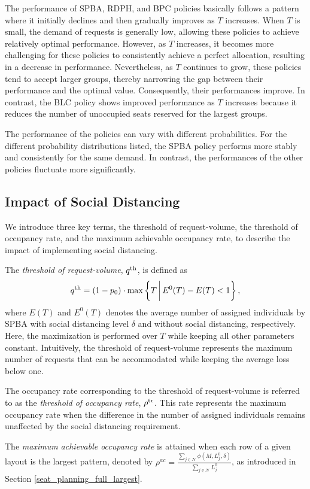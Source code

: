 The performance of SPBA, RDPH, and BPC policies basically follows a pattern where it initially declines and then gradually improves as $T$ increases. When $T$ is small, the demand of requests is generally low, allowing these policies to achieve relatively optimal performance. However, as $T$ increases, it becomes more challenging for these policies to consistently achieve a perfect allocation, resulting in a decrease in performance. Nevertheless, as $T$ continues to grow, these policies tend to accept larger groups, thereby narrowing the gap between their performance and the optimal value. Consequently, their performances improve. In contrast, the BLC policy shows improved performance as $T$ increases because it reduces the number of unoccupied seats reserved for the largest groups. 

The performance of the policies can vary with different probabilities. For the different probability distributions listed, the SPBA policy performs more stably and consistently for the same demand. In contrast, the performances of the other policies fluctuate more significantly.


\subsection{Impact of Social Distancing}\label{impact_sd}
We introduce three key terms, the threshold of request-volume, the threshold of occupancy rate, and the maximum achievable occupancy rate, to describe the impact of implementing social distancing.

The \textit{threshold of request-volume}, ${q}^{\textup{th}}$, is defined as 
\[
{q}^{\textup{th}} = (1- p_0) \cdot \max\left\{T \,\bigg|\, E^{0}(T) - E(T) < 1\right\},
\]
where $E(T)$ and $E^{0}(T)$ denotes the average number of assigned individuals by SPBA with social distancing level $\delta$ and without social distancing, respectively. Here, the maximization is performed over $T$ while keeping all other parameters constant.
Intuitively, the threshold of request-volume represents the maximum number of requests that can be accommodated while keeping the average loss below one.


The occupancy rate corresponding to the threshold of request-volume is referred to as the \textit{threshold of occupancy rate}, $\rho^{\textup{tr}}$. This rate represents the maximum occupancy rate when the difference in the number of assigned individuals remains unaffected by the social distancing requirement.

The \textit{maximum achievable occupancy rate} is attained when each row of a given layout is the largest pattern, denoted by $\rho^{ac} = \frac{\sum_{j \in \mathcal{N}}\phi(M, L_{j}^{0}, \delta)}{\sum_{j \in \mathcal{N}} L_{j}^{0}}$, as introduced in Section \ref{seat_planning_full_largest}.

